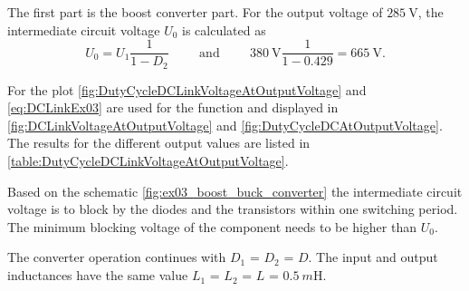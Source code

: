
\begin{solutionblock}
    The first part is the boost converter part. For the output voltage 
    of $\SI{285}{\volt}$, the intermediate circuit voltage $U_\mathrm{0}$ is calculated as
    \begin{equation}
        U_\mathrm{0}=U_\mathrm{1} \frac{1}{1-D_\mathrm{2}} 
        \hspace{1cm} \mathrm{and} \hspace{1cm}  
        \SI{380}{\volt} \frac{1}{1-0.429} = \SI{665}{\volt}.
        \label{eq:DCLinkEx03}        
    \end{equation}
\end{solutionblock}



\begin{solutionblock}
    For the plot \eqref{fig:DutyCycleDCLinkVoltageAtOutputVoltage} and \eqref{eq:DCLinkEx03} are used for the function and 
    displayed in \autoref{fig:DCLinkVoltageAtOutputVoltage} and \autoref{fig:DutyCycleDCAtOutputVoltage}. The results for the different output values are listed in \autoref{table:DutyCycleDCLinkVoltageAtOutputVoltage}.

    
    


    
\end{solutionblock}


\begin{solutionblock}
    Based on the schematic \autoref{fig:ex03_boost_buck_converter} the intermediate circuit voltage is to block by the diodes and 
    the transistors within one switching period. The minimum blocking voltage of the component needs to be higher than $U_\mathrm{0}$.
\end{solutionblock}

\vspace{2em}\par
The converter operation continues with $D_\mathrm{1}$ = $D_\mathrm{2}$ = $D$. The input and output inductances 
have the same value $L_\mathrm{1}$ = $L_\mathrm{2}$ = $L$ = $\SI{0.5}{m\henry}$.

